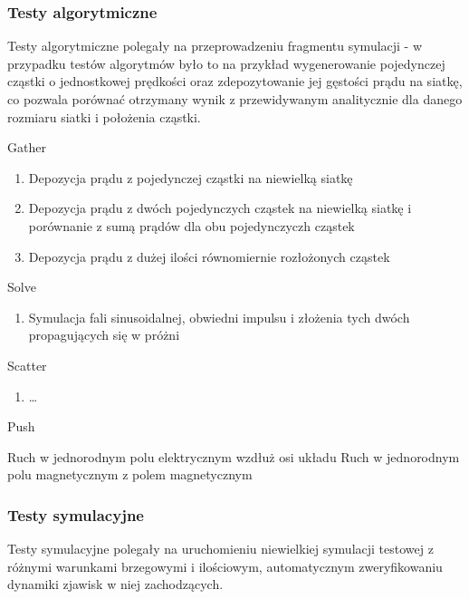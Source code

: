     \subsubsection{Testy algorytmiczne}
    Testy algorytmiczne polegały na przeprowadzeniu fragmentu symulacji - w
    przypadku testów algorytmów było to na przykład wygenerowanie pojedynczej
    cząstki o jednostkowej prędkości oraz zdepozytowanie jej gęstości prądu na
    siatkę, co pozwala porównać otrzymany wynik z przewidywanym analitycznie
    dla danego rozmiaru siatki i położenia cząstki.
    \begin{enumerate}
        \itemi Gather
            \begin{enumerate}
                \item Depozycja prądu z pojedynczej cząstki na niewielką siatkę
                \item Depozycja prądu z dwóch pojedynczych cząstek na niewielką siatkę
                    i porównanie z sumą prądów dla obu pojedynczyczh cząstek
                \item Depozycja prądu z dużej ilości równomiernie rozłożonych cząstek
            \end{enumerate}

        \itemi Solve
            \begin{enumerate}
                \item Symulacja fali sinusoidalnej, obwiedni impulsu i złożenia tych dwóch
                    propagujących się w próżni
            \end{enumerate}

        \itemi Scatter
            \begin{enumerate}
                \item \ldots {}
            \end{enumerate}

        \itemi Push
            \begin{enumerate}
                \itemii Ruch w jednorodnym polu elektrycznym wzdłuż osi układu
                \itemii Ruch w jednorodnym polu magnetycznym z polem magnetycznym
            \end{enumerate}
    \end{enumerate}

    \subsubsection{Testy symulacyjne}
    Testy symulacyjne polegały na uruchomieniu niewielkiej symulacji testowej z różnymi warunkami brzegowymi
    i ilościowym, automatycznym zweryfikowaniu dynamiki zjawisk w niej zachodzących.

